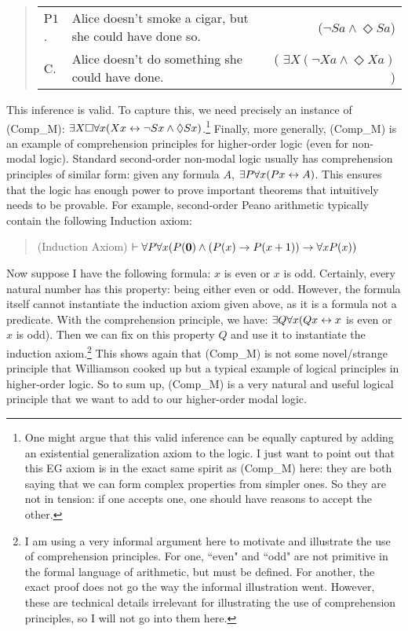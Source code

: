 \begin{quote}
\begin{tabulary}{\textwidth}{lLr}
P$1$. & Alice doesn't smoke a cigar, but she could have done so. & ($\neg Sa \wedge \Diamond Sa$) \\
C. & Alice doesn't do something she could have done. & ( $\exists X (\neg Xa \wedge \Diamond Xa)$ )
\end{tabulary}
\end{quote}
This inference is valid. To capture this, we need precisely an instance of (Comp_M): $\exists X \Box \forall x (Xx \leftrightarrow \neg Sx \wedge \Diamond Sx)$.\footnote{One might argue that this valid inference can be equally captured by adding an existential generalization axiom to the logic. I just want to point out that this EG axiom is in the exact same spirit as (Comp_M) here: they are both saying that we can form complex properties from simpler ones. So they are not in tension: if one accepts one, one should have reasons to accept the other. } 
Finally, more generally, (Comp_M) is an example of comprehension principles for higher-order logic (even for non-modal logic). Standard second-order non-modal logic usually has comprehension principles of similar form: given any formula $A$, $\exists P \forall x (Px \leftrightarrow A)$. This ensures that the logic has enough power to prove important theorems  that intuitively needs to be provable. For example, second-order Peano arithmetic typically contain the following Induction axiom: 
\begin{quote}
(Induction Axiom) \hspace{\labelsep}  $\vdash \forall P \forall x (P(\mathbf{0}) \wedge (P(x) \rightarrow P(x+1)) \rightarrow \forall x P(x))$ 
\end{quote}
Now suppose I have the following formula: $x$ is even or $x$ is odd. Certainly, every natural number has this property: being either even or odd. However, the formula itself cannot instantiate the induction axiom given above, as it is a formula not a predicate. With the comprehension principle, we have: $\exists Q \forall x (Qx \leftrightarrow x $ is even or $ x $ is odd)$ $. Then we can fix on this property $Q$ and use it to instantiate the induction axiom.\footnote{I am using a very informal argument here to motivate and illustrate the use of comprehension principles. For one, ``even" and ``odd" are not primitive in the formal language of arithmetic, but must be defined. For another, the exact proof does not go the way the informal illustration went. However, these are technical details irrelevant for illustrating the use of comprehension principles, so I will not go into them here.}
This shows again that (Comp_M) is not some novel/strange principle that Williamson cooked up but a typical example of logical principles in higher-order logic. So to sum up, (Comp_M) is a very natural and useful logical principle that we want to add to our higher-order modal logic. 

